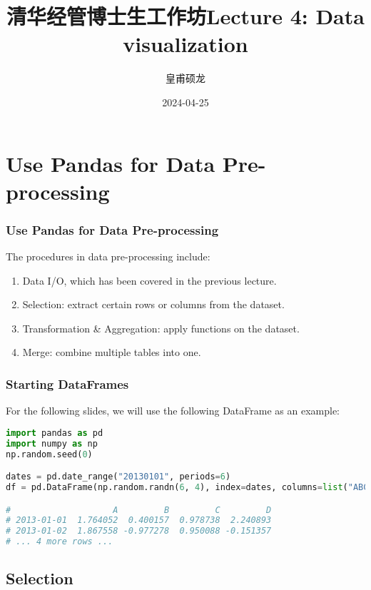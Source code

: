 \documentclass[beamer, en, version=2.0]{huangfusl-template}
\title[Lecture 4: Data visualization]{\LARGE{清华经管博士生工作坊}\newline\newline \large{Lecture 4: Data visualization}}
\author{皇甫硕龙}
\date{2024-04-25}
\begin{document}
    \begin{frame}
        \maketitle
    \end{frame}

    \section{Use Pandas for Data Pre-processing}

    \begin{frame}
        \frametitle{Use Pandas for Data Pre-processing}

        The procedures in data pre-processing include:

        \begin{enumerate}
            \item Data I/O, which has been covered in the previous lecture.
            \item Selection: extract certain rows or columns from the dataset.
            \item Transformation \& Aggregation: apply functions on the dataset.
            \item Merge: combine multiple tables into one.
        \end{enumerate}
    \end{frame}

    \begin{frame}[fragile]
        \frametitle{Starting DataFrames}

        For the following slides, we will use the following DataFrame as an example:

\begin{lstlisting}[language=python]
import pandas as pd
import numpy as np
np.random.seed(0)

dates = pd.date_range("20130101", periods=6)
df = pd.DataFrame(np.random.randn(6, 4), index=dates, columns=list("ABCD"))

#                    A         B         C         D
# 2013-01-01  1.764052  0.400157  0.978738  2.240893
# 2013-01-02  1.867558 -0.977278  0.950088 -0.151357
# ... 4 more rows ...
\end{lstlisting}

    \end{frame}

    \subsection{Selection}
\end{document}
